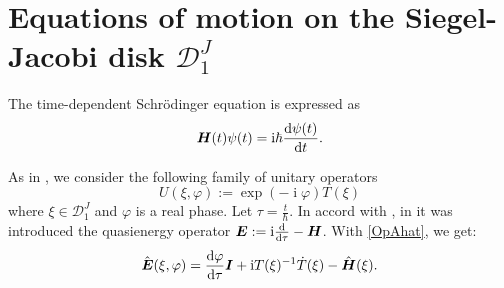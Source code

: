 \documentclass[12pt]{amsart}
\numberwithin{equation}{section}
\theoremstyle{definition}
\begin{document}
\section{Equations of motion on the Siegel-Jacobi disk
${{\mathcal{{D}}}}^J_1$}\label{ecMSJ}
The time-dependent Schr\"odinger equation is expressed as
\begin{equation}\label{SCH}
{{\mbox{\boldmath{${H}$}}}}(t)\psi(t)={\operatorname{i}}\hbar\frac{{\operatorname{d}} \psi(t)}{{\operatorname{d}} t}.
\end{equation}

As in  \cite{cezar},  we  consider the following family of unitary operators
\begin{equation}\label{uoper}
U(\xi,\varphi):=\exp(-{\operatorname{i}}\varphi)T(\xi)
\end{equation}
where $\xi\in{{\mathcal{{D}}}}^J_1$ and $\varphi$ is a real phase. Let
$\tau=\frac{t}{\hbar}$. In accord with \cite{how},  in \cite{cezar}  it 
was introduced  the quasienergy operator ${{\mbox{\boldmath{${E}$}}}}:={\operatorname{i}}\frac{\operatorname{d}}{{\operatorname{d}} \tau}
-{{\mbox{\boldmath{${H}$}}}}$. With \eqref{OpAhat},  we get:
\begin{equation}\label{Ehat}
\hat{{{\mbox{\boldmath{${E}$}}}}}(\xi,\varphi)=\frac{{\operatorname{d}}\varphi }{{\operatorname{d}} \tau}{{\mbox{\boldmath{${I}$}}}}+{\operatorname{i}} T(\xi)^{-1}\dot{T}(\xi)-\hat{{{\mbox{\boldmath{${H}$}}}}}(\xi).
\end{equation}
\end{document}
